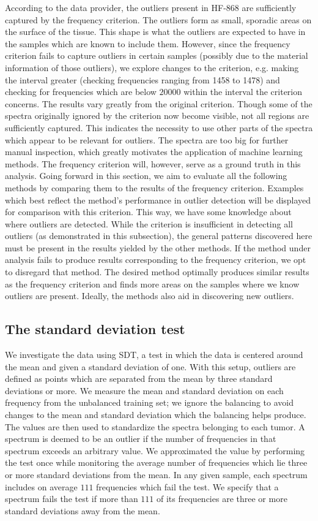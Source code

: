According to the data provider, the outliers present in HF-868 are sufficiently captured by the frequency criterion. The outliers form as small, sporadic areas on the surface of the tissue. This shape is what the outliers are expected to have in the samples which are known to include them. However, since the frequency criterion fails to capture outliers in certain samples (possibly due to the material information of those outliers), we explore changes to the criterion, e.g. making the interval greater (checking frequencies ranging from 1458 to 1478) and checking for frequencies which are below $20000$ within the interval the criterion concerns. The results vary greatly from the original criterion. Though some of the spectra originally ignored by the criterion now become visible, not all regions are sufficiently captured. This indicates the necessity to use other parts of the spectra which appear to be relevant for outliers. The spectra are too big for further manual inspection, which greatly motivates the application of machine learning methods. The frequency criterion will, however, serve as a ground truth in this analysis. Going forward in this section, we aim to evaluate all the following methods by comparing them to the results of the frequency criterion. Examples which best reflect the method's performance in outlier detection will be displayed for comparison with this criterion. This way, we have some knowledge about where outliers are detected. While the criterion is insufficient in detecting all  outliers (as demonstrated in this subsection), the general patterns discovered here must be present in the results yielded by the other methods. If the method under analysis fails to produce results corresponding to the frequency criterion, we opt to disregard that method. The desired method optimally produces similar results as the frequency criterion and finds more areas on the samples where we know outliers are present. Ideally, the methods also aid in discovering new outliers.

\subsection{The standard deviation test}

We investigate the data using SDT, a test in which the data is centered around the mean and given a standard deviation of one. With this setup, outliers are defined as points which are separated from the mean by three standard deviations or more. We measure the mean and standard deviation on each frequency from the unbalanced training set; we ignore the balancing to avoid changes to the mean and standard deviation which the balancing helps produce. The values are then used to standardize the spectra belonging to each tumor. A spectrum is deemed to be an outlier if the number of frequencies in that spectrum exceeds an arbitrary value. We approximated the value by performing the test once while monitoring the average number of frequencies which lie three or more standard deviations from the mean. In any given sample, each spectrum includes on average $111$ frequencies which fail the test. We specify that a spectrum fails the test if more than $111$ of its frequencies are three or more standard deviations away from the mean.

